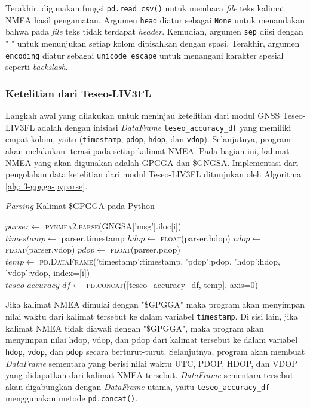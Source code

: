Terakhir, digunakan fungsi \texttt{pd.read\_csv()} untuk membaca \textit{file} teks kalimat NMEA hasil pengamatan. Argumen \texttt{head} diatur sebagai \texttt{None} untuk menandakan bahwa pada \textit{file} teks tidak terdapat \textit{header}. Kemudian, argumen \texttt{sep} diisi dengan " 
" untuk menunjukan setiap kolom dipisahkan dengan spasi. Terakhir, argumen \texttt{encoding} diatur sebagai \texttt{unicode\_escape} untuk menangani karakter spesial seperti \textit{backslash}.

\subsubsection{Ketelitian dari Teseo\hyp{}LIV3FL}
Langkah awal yang dilakukan untuk meninjau ketelitian dari modul GNSS Teseo\hyp{}LIV3FL adalah dengan inisiasi \textit{DataFrame} \texttt{teseo\_accuracy\_df} yang memiliki empat kolom, yaitu (\texttt{timestamp}, \texttt{pdop}, \texttt{hdop}, dan \texttt{vdop}). Selanjutnya, program akan melakukan iterasi pada setiap kalimat NMEA. Pada bagian ini, kalimat NMEA yang akan digunakan adalah GPGGA dan \$GNGSA. Implementasi dari pengolahan data ketelitian dari modul Teseo\hyp{}LIV3FL ditunjukan oleh Algoritma \ref{alg: 3-gpgga-pyparse}.

\begin{algorithm}[H]
	\caption{\textit{Parsing} Kalimat \$GPGGA pada Python}
	\label{alg: 3-gpgga-pyparse}
	\begin{algorithmic}[1]
		\State $parser \gets$ \textsc{pynmea2.parse}(GNGSA['msg'].iloc[i])
		\\
		\State $timestamp \gets$ parser.timestamp
		\Else
		\State $hdop \gets$ \textsc{float}(parser.hdop)
		\State $vdop \gets$ \textsc{float}(parser.vdop)
		\State $pdop \gets$ \textsc{float}(parser.pdop)
		\\
		\State $temp \gets$ \textsc{pd.DataFrame}({'timestamp':timestamp, 'pdop':pdop, 'hdop':hdop, 'vdop':vdop}, index=[i])
		\\
		\State $teseo\_accuracy\_df \gets$ \textsc{pd.concat}([teseo\_accuracy\_df, temp], axis=0)
		\EndIf
	\EndFor		
	\end{algorithmic}
\end{algorithm}

Jika kalimat NMEA dimulai dengan "\$GPGGA" maka program akan menyimpan nilai waktu dari kalimat tersebut ke dalam variabel \texttt{timestamp}. Di sisi lain, jika kalimat NMEA tidak diawali dengan "\$GPGGA", maka program akan menyimpan nilai hdop, vdop, dan pdop dari kalimat tersebut ke dalam variabel \texttt{hdop}, \texttt{vdop}, dan \texttt{pdop} secara berturut-turut. Selanjutnya, program akan membuat \textit{DataFrame} sementara yang berisi nilai waktu UTC, PDOP, HDOP, dan VDOP yang didapatkan dari kalimat NMEA tersebut. \textit{DataFrame} sementara tersebut akan digabungkan dengan \textit{DataFrame} utama, yaitu \texttt{teseo\_accuracy\_df} menggunakan metode \texttt{pd.concat()}.

